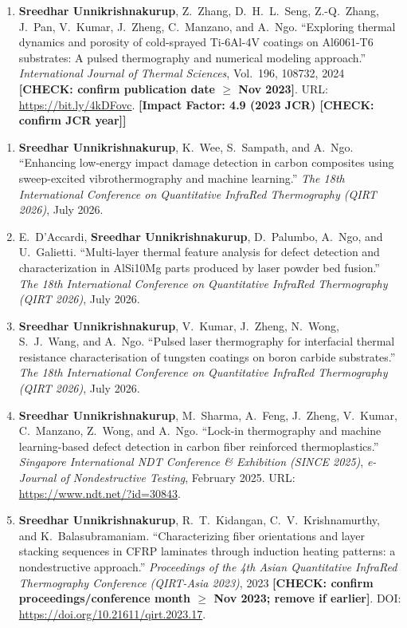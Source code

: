 \documentclass[10pt,a4paper]{article}
\makeatletter
\newcommand{\myname}{\textbf{Sreedhar Unnikrishnakurup}}
\newcommand{\todo}[1]{\textbf{[CHECK: #1]}}
\renewcommand{\subsection}{\@startsection{subsection}{2}{0pt}{5pt}{2pt}{\normalsize\bfseries}}
\makeatother
\begin{document}
\begin{enumerate}[label=J\arabic*., leftmargin=2.0em, itemsep=2pt, topsep=2pt]
  \item \myname, Z.\ Zhang, D.\ H.\ L.\ Seng, Z.-Q.\ Zhang, J.\ Pan, V.\ Kumar, J.\ Zheng, C.\ Manzano, and A.\ Ngo. ``Exploring thermal dynamics and porosity of cold-sprayed Ti-6Al-4V coatings on Al6061-T6 substrates: A pulsed thermography and numerical modeling approach.'' \textit{International Journal of Thermal Sciences}, Vol.\ 196, 108732, 2024 \todo{confirm publication date $\ge$ Nov 2023}. URL: \url{https://bit.ly/4kDFovc}. \textbf{[Impact Factor: 4.9 (2023 JCR) \todo{confirm JCR year}]}
\end{enumerate}

\subsection{Conference Papers (Nov 2023 -- Nov 2026)}
\begin{enumerate}[label=C\arabic*., leftmargin=2.0em, itemsep=2pt, topsep=2pt]
  \item \myname, K.\ Wee, S.\ Sampath, and A.\ Ngo. ``Enhancing low-energy impact damage detection in carbon composites using sweep-excited vibrothermography and machine learning.'' \textit{The 18th International Conference on Quantitative InfraRed Thermography (QIRT 2026)}, July 2026.

  \item E.\ D'Accardi, \myname, D.\ Palumbo, A.\ Ngo, and U.\ Galietti. ``Multi-layer thermal feature analysis for defect detection and characterization in AlSi10Mg parts produced by laser powder bed fusion.'' \textit{The 18th International Conference on Quantitative InfraRed Thermography (QIRT 2026)}, July 2026.

  \item \myname, V.\ Kumar, J.\ Zheng, N.\ Wong, S.\ J.\ Wang, and A.\ Ngo. ``Pulsed laser thermography for interfacial thermal resistance characterisation of tungsten coatings on boron carbide substrates.'' \textit{The 18th International Conference on Quantitative InfraRed Thermography (QIRT 2026)}, July 2026.

  \item \myname, M.\ Sharma, A.\ Feng, J.\ Zheng, V.\ Kumar, C.\ Manzano, Z.\ Wong, and A.\ Ngo. ``Lock-in thermography and machine learning-based defect detection in carbon fiber reinforced thermoplastics.'' \textit{Singapore International NDT Conference \& Exhibition (SINCE 2025)}, \textit{e-Journal of Nondestructive Testing}, February 2025. URL: \url{https://www.ndt.net/?id=30843}.

  \item \myname, R.\ T.\ Kidangan, C.\ V.\ Krishnamurthy, and K.\ Balasubramaniam. ``Characterizing fiber orientations and layer stacking sequences in CFRP laminates through induction heating patterns: a nondestructive approach.'' \textit{Proceedings of the 4th Asian Quantitative InfraRed Thermography Conference (QIRT-Asia 2023)}, 2023 \todo{confirm proceedings/conference month $\ge$ Nov 2023; remove if earlier}. DOI: \url{https://doi.org/10.21611/qirt.2023.17}.


\end{enumerate}
\end{document}
